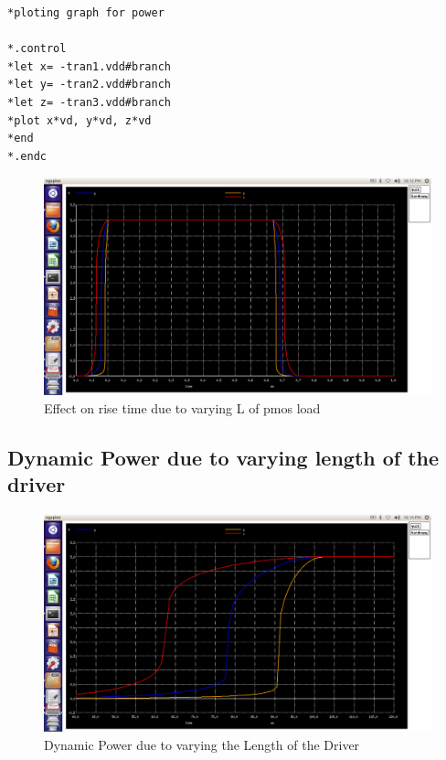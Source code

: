 \documentclass[12pt,a4paper]{article}
\begin{document}
\begin{center}
\begin{lstlisting}
*ploting graph for power

*.control
*let x= -tran1.vdd#branch
*let y= -tran2.vdd#branch
*let z= -tran3.vdd#branch
*plot x*vd, y*vd, z*vd
*end
*.endc
\end{lstlisting}

 \begin{figure}[!ht]
 \centering
 \includegraphics[scale=0.34]{lab5_5_pic1.png}
 \caption[Short]{Effect on rise time due to varying L of pmos load}
 \end{figure}
 
 \subsection{Dynamic Power due to varying length of the driver}
 \begin{figure}[!ht]
 \centering
 \includegraphics[scale=0.34]{lab5_5pic2.png}
 \caption[Short]{Dynamic Power due to varying the Length of the Driver}
 \end{figure}
 \clearpage

\end{center}
\end{document}
